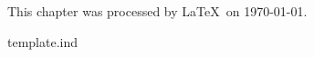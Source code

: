 \documentclass{../../tex/mitpress2e}
\begin{document}
%
%
\baselineskip=13pt

%

\let\thechapterauthors=\relax
{}
\pagestyle{headings}



\ifvmode\else\par\fi
\vspace{10pt}
This chapter was processed by \LaTeX\ on \today.



\newread\availtest
\def\readfile#1{
\openin\availtest #1
\ifeof\availtest\else

\fi\closein\availtest}

\def\DefaultIndexName{Index}
\def\acronymentry#1#2{\relax}  %
\readfile{template.ind}
\end{document}
